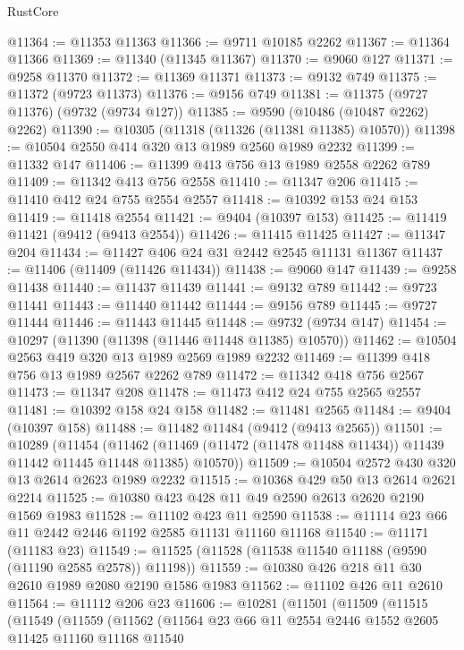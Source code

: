 \begin{lexlean}{RustCore}
\begin{coremodule}
@11364 := @11353 @11363
@11366 := @9711 @10185 @2262
@11367 := @11364 @11366
@11369 := @11340 (@11345 @11367)
@11370 := @9060 @127
@11371 := @9258 @11370
@11372 := @11369 @11371
@11373 := @9132 @749
@11375 := @11372 (@9723 @11373)
@11376 := @9156 @749
@11381 := @11375 (@9727 @11376) (@9732 (@9734 @127))
@11385 := @9590 (@10486 (@10487 @2262) @2262)
@11390 := @10305 (@11318 (@11326 (@11381 @11385) @10570))
@11398 := @10504 @2550 @414 @320 @13 @1989 @2560 @1989 @2232
@11399 := @11332 @147
@11406 := @11399 @413 @756 @13 @1989 @2558 @2262 @789
@11409 := @11342 @413 @756 @2558
@11410 := @11347 @206
@11415 := @11410 @412 @24 @755 @2554 @2557
@11418 := @10392 @153 @24 @153
@11419 := @11418 @2554
@11421 := @9404 (@10397 @153)
@11425 := @11419 @11421 (@9412 (@9413 @2554))
@11426 := @11415 @11425
@11427 := @11347 @204
@11434 := @11427 @406 @24 @31 @2442 @2545 @11131 @11367
@11437 := @11406 (@11409 (@11426 @11434))
@11438 := @9060 @147
@11439 := @9258 @11438
@11440 := @11437 @11439
@11441 := @9132 @789
@11442 := @9723 @11441
@11443 := @11440 @11442
@11444 := @9156 @789
@11445 := @9727 @11444
@11446 := @11443 @11445
@11448 := @9732 (@9734 @147)
@11454 := @10297 (@11390 (@11398 (@11446 @11448 @11385) @10570))
@11462 := @10504 @2563 @419 @320 @13 @1989 @2569 @1989 @2232
@11469 := @11399 @418 @756 @13 @1989 @2567 @2262 @789
@11472 := @11342 @418 @756 @2567
@11473 := @11347 @208
@11478 := @11473 @412 @24 @755 @2565 @2557
@11481 := @10392 @158 @24 @158
@11482 := @11481 @2565
@11484 := @9404 (@10397 @158)
@11488 := @11482 @11484 (@9412 (@9413 @2565))
@11501 := @10289
    (@11454
      (@11462 (@11469 (@11472 (@11478 @11488 @11434)) @11439 @11442 @11445 @11448 @11385) @10570))
@11509 := @10504 @2572 @430 @320 @13 @2614 @2623 @1989 @2232
@11515 := @10368 @429 @50 @13 @2614 @2621 @2214
@11525 := @10380 @423 @428 @11 @49 @2590 @2613 @2620 @2190 @1569 @1983
@11528 := @11102 @423 @11 @2590
@11538 := @11114 @23 @66 @11 @2442 @2446 @1192 @2585 @11131 @11160 @11168
@11540 := @11171 (@11183 @23)
@11549 := @11525 (@11528 (@11538 @11540 @11188 (@9590 (@11190 @2585 @2578)) @11198))
@11559 := @10380 @426 @218 @11 @30 @2610 @1989 @2080 @2190 @1586 @1983
@11562 := @11102 @426 @11 @2610
@11564 := @11112 @206 @23
@11606 := @10281
    (@11501
      (@11509
        (@11515
          (@11549
            (@11559
              (@11562
                (@11564
                  @23
                  @66
                  @11
                  @2554
                  @2446
                  @1552
                  @2605
                  @11425
                  @11160
                  @11168
                  @11540

\end{coremodule}
\end{lexlean}
